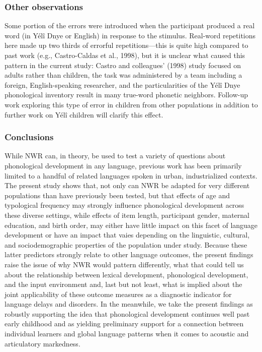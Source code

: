 \documentclass[english,,man,floatsintext]{apa6}
\begin{document}
\hypertarget{other-observations}{%
\subsubsection{Other observations}\label{other-observations}}

Some portion of the errors were introduced when the participant produced a real word (in Yélî Dnye or English) in response to the stimulus. Real-word repetitions here made up two thirds of errorful repetitions---this is quite high compared to past work (e.g., Castro-Caldas et al., 1998), but it is unclear what caused this pattern in the current study: Castro and colleagues' (1998) study focused on adults rather than children, the task was administered by a team including a foreign, English-speaking researcher, and the particularities of the Yélî Dnye phonological inventory result in many true-word phonetic neighbors. Follow-up work exploring this type of error in children from other populations in addition to further work on Yélî children will clarify this effect.

\hypertarget{conclusions}{%
\subsubsection{Conclusions}\label{conclusions}}

While NWR can, in theory, be used to test a variety of questions about phonological development in any language, previous work has been primarily limited to a handful of related languages spoken in urban, industrialized contexts. The present study shows that, not only can NWR be adapted for very different populations than have previously been tested, but that effects of age and typological frequency may strongly influence phonological development across these diverse settings, while effects of item length, participant gender, maternal education, and birth order, may either have little impact on this facet of language development or have an impact that vaies depending on the linguistic, cultural, and sociodemographic properties of the population under study. Because these latter predictors strongly relate to other language outcomes, the present findings raise the issue of why NWR would pattern differently, what that could tell us about the relationship between lexical development, phonological development, and the input environment and, last but not least, what is implied about the joint applicability of these outcome measures as a diagnostic indicator for language delays and disorders. In the meanwhile, we take the present findings as robustly supporting the idea that phonological development continues well past early childhood and as yielding preliminary support for a connection between individual learners and global language patterns when it comes to acoustic and articulatory markedness.
\end{document}

